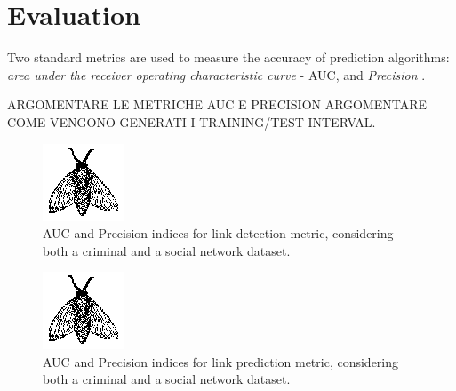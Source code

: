 \section{Evaluation}
\label{sec:evaluation}

Two standard metrics are used to measure the accuracy of prediction algorithms: \textit{area under the receiver operating characteristic curve} - AUC, and  \textit{Precision} \cite{Lu2011}.

ARGOMENTARE LE METRICHE AUC E PRECISION
ARGOMENTARE COME VENGONO GENERATI I TRAINING/TEST INTERVAL.

\begin{figure}
	\centering
	\includegraphics{./fig/fly}
	\caption{AUC and Precision indices for link detection metric, considering both a criminal and a social network dataset.}
	\label{fig:performance-detection}
\end{figure}

\begin{figure}
	\centering
	\includegraphics{./fig/fly}
	\caption{AUC and Precision indices for link prediction metric, considering both a criminal and a social network dataset.}
	\label{fig:performance-prediction}
\end{figure}


